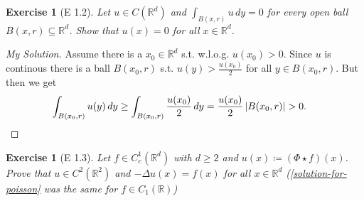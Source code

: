 \documentclass{report}
\theoremstyle{tommy}
\newtheorem{lem}[defn]{Lemma}
\newtheorem{ex}[defn]{Exercise}
\begin{document}
  \begin{ex}[E 1.2]
    Let \(u \in C(\mathbb{R}^d)\) and \(\int_{B(x, r)} u \, dy = 0\) for every open ball \(B(x, r) \subseteq \mathbb{R}^d\). Show that \(u(x) = 0\) for all \(x \in \mathbb{R}^d\).
  \end{ex}

  \begin{proof}[My Solution]
    Assume there is a \(x_0 \in \mathbb{R}^d\) s.t. w.l.o.g. \(u(x_0) > 0\). Since \(u\) is continous there is a ball \(B(x_0, r)\) s.t. \(u(y) > \frac{u(x_0)}{2}\) for all \(y \in B(x_0, r)\). But then we get
    \begin{align*}
      \int_{B(x_0, r)} u(y) \, dy
      &\ge \int_{B(x_0, r)} \frac{u(x_0)}{2} \, dy
      = \frac{u(x_0)}{2} \, |B(x_0, r)| > 0. \qedhere
    \end{align*}
  \end{proof}

  \begin{ex}[E 1.3]
    Let \(f \in C_c^1(\mathbb{R}^d)\) with \(d \ge 2\) and \(u(x) \coloneqq (\Phi \star f)(x)\). Prove that \(u \in C^2(\mathbb{R}^2)\) and \(- \Delta u(x) = f(x)\) for all \(x \in \mathbb{R}^d\) (\ref{solution-for-poisson} was the same for \(f \in C_1(\mathbb{R})\))
  \end{ex}

    
\end{document}
